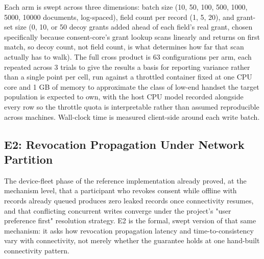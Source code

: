 Each arm is swept across three dimensions: batch size (10, 50, 100, 500, 1000, 5000, 10000 documents, log-spaced), field count per record (1, 5, 20), and grant-set size (0, 10, or 50 decoy grants added ahead of each field's real grant, chosen specifically because consent-core's grant lookup scans linearly and returns on first match, so decoy count, not field count, is what determines how far that scan actually has to walk). The full cross product is 63 configurations per arm, each repeated across 3 trials to give the results a basis for reporting variance rather than a single point per cell, run against a throttled container fixed at one CPU core and 1 GB of memory to approximate the class of low-end handset the target population is expected to own, with the host CPU model recorded alongside every row so the throttle quota is interpretable rather than assumed reproducible across machines. Wall-clock time is measured client-side around each write batch.

\subsection{E2: Revocation Propagation Under Network Partition}

The device-fleet phase of the reference implementation already proved, at the mechanism level, that a participant who revokes consent while offline with records already queued produces zero leaked records once connectivity resumes, and that conflicting concurrent writes converge under the project's "user preference first" resolution strategy. E2 is the formal, swept version of that same mechanism: it asks how revocation propagation latency and time-to-consistency vary with connectivity, not merely whether the guarantee holds at one hand-built connectivity pattern.

